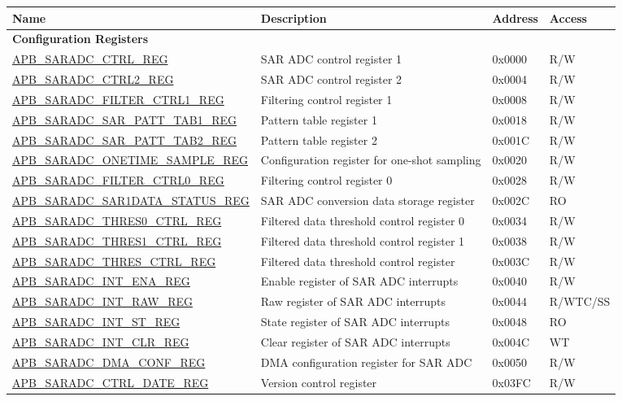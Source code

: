 \begin{longtable}{ | p{7cm} | p{5.2cm} | p{1.3cm} | p{1.6cm} | }
\hline\rowcolor{lightgray}
\textbf{Name} & \textbf{Description} &  \textbf{Address} & \textbf{Access} \\ \hline
\endhead
\multicolumn{4}{|l|}{\textbf{Configuration Registers}} \\ \hline
\hyperref[regdesc:APBSARADCCTRLREG]{APB\_SARADC\_CTRL\_REG} & SAR ADC control register 1 & 0x0000 & R/W \\ \hline
\hyperref[regdesc:APBSARADCCTRL2REG]{APB\_SARADC\_CTRL2\_REG} & SAR ADC control register 2 & 0x0004 & R/W \\ \hline
\hyperref[regdesc:APBSARADCFILTERCTRL1REG]{APB\_SARADC\_FILTER\_CTRL1\_REG} & Filtering control register 1 & 0x0008 & R/W \\ \hline
\hyperref[regdesc:APBSARADCSARPATTTAB1REG]{APB\_SARADC\_SAR\_PATT\_TAB1\_REG} & Pattern table register 1 & 0x0018 & R/W \\ \hline
\hyperref[regdesc:APBSARADCSARPATTTAB2REG]{APB\_SARADC\_SAR\_PATT\_TAB2\_REG} & Pattern table register 2 & 0x001C & R/W \\ \hline
\hyperref[regdesc:APBSARADCONETIMESAMPLEREG]{APB\_SARADC\_ONETIME\_SAMPLE\_REG} & Configuration register for one-shot sampling & 0x0020 & R/W \\ \hline
\hyperref[regdesc:APBSARADCFILTERCTRL0REG]{APB\_SARADC\_FILTER\_CTRL0\_REG} & Filtering control register 0 & 0x0028 & R/W \\ \hline
\hyperref[regdesc:APBSARADCSAR1DATASTATUSREG]{APB\_SARADC\_SAR1DATA\_STATUS\_REG} & SAR ADC conversion data storage register & 0x002C & RO \\ \hline
\hyperref[regdesc:APBSARADCTHRES0CTRLREG]{APB\_SARADC\_THRES0\_CTRL\_REG} & Filtered data threshold control register 0 & 0x0034 & R/W \\ \hline
\hyperref[regdesc:APBSARADCTHRES1CTRLREG]{APB\_SARADC\_THRES1\_CTRL\_REG} & Filtered data threshold control register 1 & 0x0038 & R/W \\ \hline
\hyperref[regdesc:APBSARADCTHRESCTRLREG]{APB\_SARADC\_THRES\_CTRL\_REG} & Filtered data threshold control register & 0x003C & R/W \\ \hline
\hyperref[regdesc:APBSARADCINTENAREG]{APB\_SARADC\_INT\_ENA\_REG} & Enable register of SAR ADC interrupts & 0x0040 & R/W \\ \hline
\hyperref[regdesc:APBSARADCINTRAWREG]{APB\_SARADC\_INT\_RAW\_REG} & Raw register of SAR ADC interrupts & 0x0044 & R/WTC/SS \\ \hline
\hyperref[regdesc:APBSARADCINTSTREG]{APB\_SARADC\_INT\_ST\_REG} & State register of SAR ADC interrupts & 0x0048 & RO \\ \hline
\hyperref[regdesc:APBSARADCINTCLRREG]{APB\_SARADC\_INT\_CLR\_REG} & Clear register of SAR ADC interrupts & 0x004C & WT \\ \hline
\hyperref[regdesc:APBSARADCDMACONFREG]{APB\_SARADC\_DMA\_CONF\_REG} & DMA configuration register for SAR ADC & 0x0050 & R/W \\ \hline
\hyperref[regdesc:APBSARADCCTRLDATEREG]{APB\_SARADC\_CTRL\_DATE\_REG} & Version control register & 0x03FC & R/W \\ \hline
\end{longtable}
